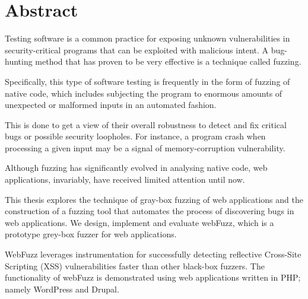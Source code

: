 \section*{\LARGE{Abstract}}

Testing software is a common practice for exposing unknown vulnerabilities
in security-critical programs that can be exploited with malicious intent.
A bug-hunting method that has proven to be very effective is a technique
called fuzzing. 

Specifically, this type of software testing is frequently in the
form of fuzzing of native code, which includes subjecting the program to
enormous amounts of unexpected or malformed inputs in an automated fashion.

This is done to get a view of their overall robustness to detect and fix
critical bugs or possible security loopholes. For instance, a program crash
when processing a given input may be a signal of memory-corruption
vulnerability.

Although fuzzing has significantly evolved in analysing native code, web
applications, invariably, have received limited attention until now. 

This thesis explores the technique of gray-box fuzzing of web applications and the
construction of a fuzzing tool that automates the process of discovering
bugs in web applications. We design, implement and evaluate webFuzz, which is a prototype grey-box
fuzzer for web applications. 

WebFuzz leverages instrumentation for successfully
detecting reflective Cross-Site Scripting (XSS) vulnerabilities faster than other
black-box fuzzers. The functionality of webFuzz is demonstrated using web applications
written in PHP; namely WordPress and Drupal.